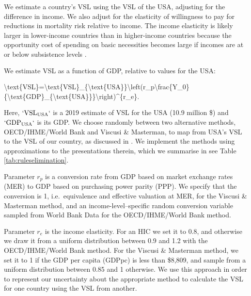\documentclass[
]{article}
\newenvironment{Shaded}{\begin{snugshade}}{\end{snugshade}}
\newcommand{\NormalTok}[1]{#1}
\begin{document}
We estimate a country's VSL using the VSL of the USA, adjusting for the difference in income. We also adjust for the elasticity of willingness to pay for reductions in mortality risk relative to income. The income elasticity is likely larger in lower-income countries than in higher-income countries because the opportunity cost of spending on basic necessities becomes large if incomes are at or below subsistence levels \citep{Hammitt2020}.

We estimate VSL as a function of GDP, relative to values for the USA:

\begin{Shaded}
\begin{Highlighting}[]
\NormalTok{\textbackslash{}text\{VSL\}=\textbackslash{}text\{VSL\}\_\{\textbackslash{}text\{USA\}\}\textbackslash{}left(r\_p\textbackslash{}frac\{Y\_0\}\{\textbackslash{}text\{GDP\}\_\{\textbackslash{}text\{USA\}\}\}\textbackslash{}right)\^{}\{r\_e\}.}
\end{Highlighting}
\end{Shaded}

Here, \(`\text{VSL}_{\text{USA}}`\) is a 2019 estimate of VSL for the USA (10.9 million \$) and \(`\text{GDP}_{\text{USA}}`\) is its GDP. We choose randomly between two alternative methods, OECD/IHME/World Bank and Viscusi \& Masterman, to map from USA's VSL to the VSL of our country, as discussed in \citet{Robinson2021}. We implement the methods using approximations to the presentations therein, which we summarise in see Table \ref{tab:ruleselimination}.

Parameter \(r_p\) is a conversion rate from GDP based on market exchange rates (MER) to GDP based on purchasing power parity (PPP). We specify that the conversion is 1, i.e.~equivalence and effective valuation at MER, for the Viscusi \& Masterman method, and an income-level--specific random conversion variable sampled from World Bank Data for the OECD/IHME/World Bank method.

Parameter \(r_e\) is the income elasticity. For an HIC we set it to 0.8, and otherwise we draw it from a uniform distribution between 0.9 and 1.2 with the OECD/IHME/World Bank method. For the Viscusi \& Masterman method, we set it to 1 if the GDP per capita (GDPpc) is less than \$8,809, and sample from a uniform distribution between 0.85 and 1 otherwise. We use this approach in order to represent our uncertainty about the appropriate method to calculate the VSL for one country using the VSL from another.
\end{document}
